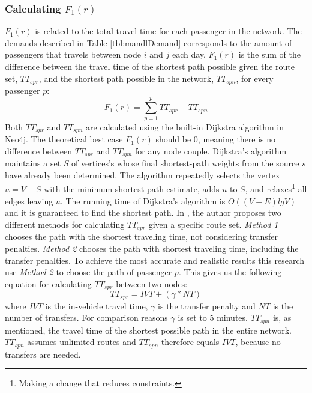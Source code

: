 \subsubsection*{Calculating $F_{1}(r)$}
\label{sec:f1}
$F_{1}(r)$ is related to the total travel time for each passenger in the network. The demands described in Table \vref{tbl:mandlDemand} corresponds to the amount of passengers that travels between node $i$ and $j$ each day. $F_{1}(r)$ is the sum of the difference between the travel time of the shortest path possible given the route set, $TT_{spr}$, and the shortest path possible in the network, $TT_{spn}$, for every passenger $p$:
\newline
$$F_{1}(r) = \sum\limits^{p}_{p=1}TT_{spr}-TT_{spn}$$
\newline
Both $TT_{spr}$ and $TT_{spn}$ are calculated using the built-in Dijkstra algorithm in Neo4j. The theoretical best case $F_{1}(r)$ should be 0, meaning there is no difference between $TT_{spr}$ and $TT_{spn}$ for any node couple. Dijkstra's algorithm \citet[p.658-662]{cormen09} maintains a set $S$ of vertices's whose final shortest-path weights from the source $s$ have already been determined. The algorithm repeatedly selects the vertex $u = V - S$ with the minimum shortest path estimate, adds $u$ to $S$, and relaxes\footnote{Making a change that reduces constraints.} all edges leaving $u$. The running time of Dijkstra's algorithm is $O((V + E)lg V)$ and it is guaranteed to find the shortest path\citep[p.~661]{cormen09}. In \citet{mandl79}, the author proposes two different methods for calculating $TT_{spr}$ given a specific route set. \textit{Method 1} chooses the path with the shortest traveling time, not considering transfer penalties. \textit{Method 2} chooses the path with shortest traveling time, including the transfer penalties. To achieve the most accurate and realistic results this research use \textit{Method 2} to choose the path of passenger $p$. This gives us the following equation for calculating $TT_{spr}$ between two nodes: 
\newline
$$TT_{spr} = IVT + (\gamma*NT)$$
\newline
where $IVT$ is the in-vehicle travel time, $\gamma$ is the transfer penalty and $NT$ is the number of transfers. For comparison reasons $\gamma$ is set to 5 minutes. $TT_{spn}$ is, as mentioned, the travel time of the shortest possible path in the entire network. $TT_{spn}$ assumes unlimited routes and $TT_{spn}$ therefore equals $IVT$, because no transfers are needed.  

